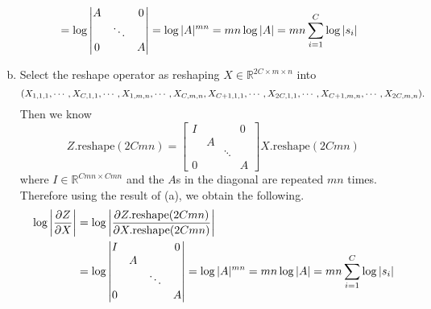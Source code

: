 \documentclass[10pt]{article}
\begin{document}
\begin{enumerate}[(a)]
\begin{align*}
        &= \log\begin{vmatrix}
            A &        & 0 \\
            & \ddots &   \\
          0 &        & A
        \end{vmatrix} = \log|A|^{mn} = mn\log|A| = mn\sum_{i=1}^{C}\log\qty|s_i|
    \end{align*}
    \item Select the reshape operator as reshaping $X \in \mathbb{R}^{2C \times m \times n}$ into 
    $$\qty(X_{1, 1, 1}, \cdots, X_{C, 1, 1}, \cdots, X_{1, m, n}, \cdots, X_{C, m, n}, X_{C+1, 1, 1}, \cdots, X_{2C, 1, 1}, \cdots, X_{C+1, m, n}, \cdots, X_{2C, m, n}).$$
    Then we know
    $$Z.\mathrm{reshape}(2Cmn) = \begin{bmatrix}
        I &   &        & 0 \\
          & A &        &   \\
          &   & \ddots &   \\
        0 &   &        & A
    \end{bmatrix}X.\mathrm{reshape}(2Cmn)$$
    where $I \in \mathbb{R}^{Cmn \times Cmn}$ and the $A$s in the diagonal are repeated $mn$ times.
    Therefore using the result of (a), we obtain the following.
    \begin{align*}
        \log\qty|\frac{\partial Z}{\partial X}| &= \log\qty|\frac{\partial Z.\mathrm{reshape}(2Cmn)}{\partial X.\mathrm{reshape}(2Cmn)}| \\
        &= \log\begin{vmatrix}
            I &   &        & 0 \\
              & A &        &   \\
              &   & \ddots &   \\
            0 &   &        & A
        \end{vmatrix} = \log|A|^{mn} = mn\log|A| = mn\sum_{i=1}^{C}\log\qty|s_i|
    \end{align*}
\end{enumerate}
\end{document}
